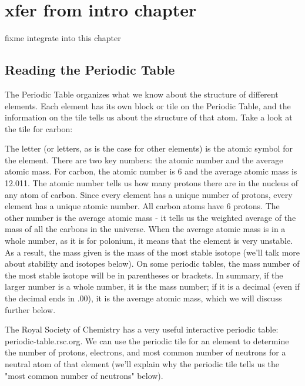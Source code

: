 \section{xfer from intro chapter} 
fixme integrate into this chapter
\subsection{Reading the Periodic Table}
The Periodic Table organizes what we know about the structure of different
elements. Each element has its own block or tile on the Periodic Table, and the
information on the tile tells us about the structure of that atom. Take a look at
the tile for carbon:

\begin{center}
\end{center}

The letter (or letters, as is the case for other elements) is the atomic symbol
for the element. There are two key numbers: the atomic number and the average
atomic mass. For carbon, the atomic number is 6 and the average atomic mass is
12.011. The atomic number tells us how many protons there are in the nucleus of
any atom of carbon. Since every element has a unique number of protons, every
element has a unique atomic number. All carbon atoms have 6 protons. The other
number is the average atomic mass - it tells us the weighted average of the
mass of all the carbons in the universe. When the average atomic mass is in
a whole number, as it is for polonium, it means that the element is very unstable.
As a result, the mass given is the mass of the most stable isotope (we'll talk
more about stability and isotopes below). On some periodic tables, the mass
number of the most stable isotope will be in parentheses or brackets. In
summary, if the larger number is a whole number, it is the mass number; if it
is a decimal (even if the decimal ends in .00), it is the average atomic mass,
which we will discuss further below.

\begin{center}
\end{center}

The Royal Society of Chemistry has a very useful interactive periodic table:
periodic-table.rsc.org. We can use the periodic tile for an element to
determine the number of protons, electrons, and most common number of neutrons
for a neutral atom of that element (we'll explain why the periodic tile tells
us the "most common number of neutrons" below).

